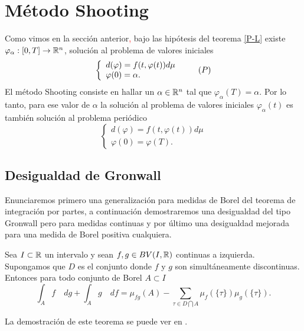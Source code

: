 \section{Método Shooting }
Como vimos en la sección anterior\textcolor{red}{,} bajo las hipótesis del teorema \ref{P-L}  existe  $\varphi_\alpha:[0,T]\to \mathbb{R}^n$,  solución al problema de valores iniciales 
 \begin{equation}
	\left\lbrace \begin{array}{l}
		d(\varphi)=f(t,\varphi(t))d\mu\\
		\varphi(0)=\alpha.
	\end{array}\right. \tag{${P}$}
\end{equation}
El método Shooting consiste en hallar un $\alpha\in\mathbb{R}^n$ tal que $\varphi_\alpha(T)=\alpha$.  
Por lo tanto, para ese valor de $\alpha$ la solución al problema de valores iniciales  $\varphi_\alpha(t)$ es también solución al problema periódico 
 \begin{equation*}
	\left\lbrace \begin{array}{l}
		d(\varphi)=f(t,\varphi(t))d\mu\\
		\varphi(0)=\varphi(T).
	\end{array}\right. 
\end{equation*}



\subsection{Desigualdad de Gronwall}
Enunciaremos primero una generalización para medidas de Borel del teorema de integración por partes, a continuación demostraremos una desigualdad del tipo Gronwall pero para medidas continuas y por último una desigualdad mejorada para una medida de Borel positiva cualquiera.


\begin{thm}\label{T Partes}
	Sea $I\subset\mathbb{R}$ un intervalo y sean $f,g\in BV(I,\mathbb{R})$ continuas a izquierda. Supongamos que $D$ es el conjunto donde $f$ y $g$ son simultáneamente  discontinuas. Entonces para todo conjunto de Borel $A\subset I$
	\begin{equation}\label{eq:Partes}
		\int_A f \quad dg+\int_Ag \quad df =\mu_{fg}(A)-\sum_{\tau\in D\bigcap A}\mu_{f}(\{\tau\})\mu_{g}(\{\tau\}).
	\end{equation}
\end{thm}
La demostración de este teorema se puede ver en \cite[Teorema 6.2.2]{Carter}.

